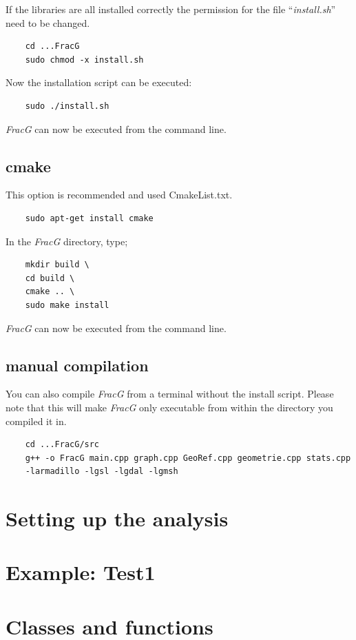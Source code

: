 \documentclass[10pt,a4paper]{article}
\begin{document}
If the libraries are all installed correctly the permission for the file ``\textit{install.sh}'' need to be changed.
\begin{verbatim}
	cd ...FracG
	sudo chmod -x install.sh 
\end{verbatim}
Now the installation script can be executed:
\begin{verbatim}
	sudo ./install.sh
\end{verbatim}
\textit{FracG} can now be executed from the command line.

\subsection{cmake}
This option is recommended and used CmakeList.txt.
\begin{verbatim}
	sudo apt-get install cmake
\end{verbatim}

In the \textit{FracG} directory, type;
\begin{verbatim}
	mkdir build \
	cd build \
	cmake .. \
	sudo make install
\end{verbatim}
\textit{FracG} can now be executed from the command line.

\subsection{manual compilation}
You can also compile \textit{FracG} from a terminal without the install script. Please note that this will make \textit{FracG} only executable from within the directory you compiled it in.

\begin{verbatim}
	cd ...FracG/src
	g++ -o FracG main.cpp graph.cpp GeoRef.cpp geometrie.cpp stats.cpp 
	-larmadillo -lgsl -lgdal -lgmsh 
\end{verbatim}

\newpage


\section{Setting up the analysis}


\section{Example: Test1}


\section{Classes and functions}
\end{document}
